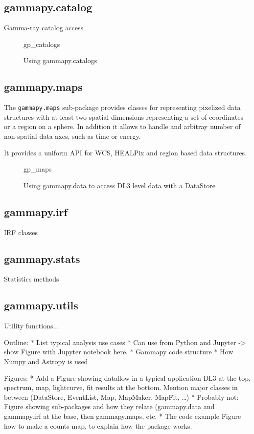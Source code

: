 \subsection{gammapy.catalog}
Gamma-ray catalog access

\begin{figure}
{gp_catalogs}
\caption{Using gammapy.catalogs}
\label{codeexample:data}
\end{figure}


\subsection{gammapy.maps}
The \verb|gammapy.maps| sub-package provides classes for representing pixelized
data structures with at least two spatial dimensions representing a set of
coordinates or a region on a sphere. In addition it allows to handle and arbitray
number of non-spatial data axes, such as time or energy.

It provides a uniform API for WCS, HEALPix and region based data structures.

\begin{figure}


    {gp_maps}
\caption{Using gammapy.data to access DL3 level data with a DataStore}
\label{codeexample:data}
\end{figure}


\subsection{gammapy.irf}
IRF classes

\subsection{gammapy.stats}
Statistics methods


\subsection{gammapy.utils}
Utility functions...


Outline:
* List typical analysis use cases
* Can use from Python and Jupyter -> show Figure with Jupyter notebook here.
* Gammapy code structure
* How Numpy and Astropy is used


Figures:
* Add a Figure showing dataflow in a typical application
DL3 at the top, spectrum, map, lightcurve, fit results at the bottom.
Mention major classes in between (DataStore, EventList, Map, MapMaker, MapFit, …)
* Probably not: Figure showing sub-packages and how they relate (gammapy.data and gammapy.irf at the base, then gammapy.maps, etc.
* The code example Figure how to make a counts map, to explain how the package works.
